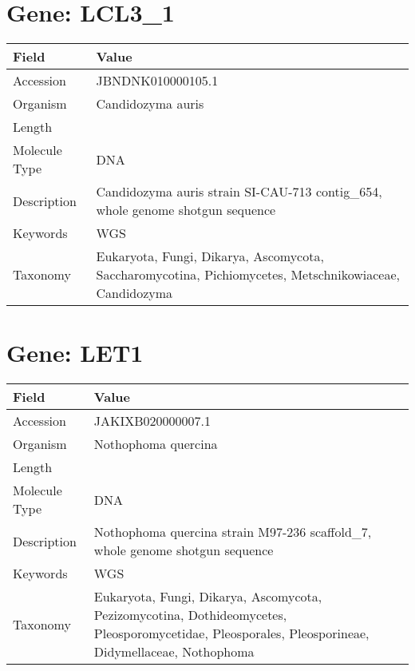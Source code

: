 \documentclass[10pt]{article}
\begin{document}
\section*{Gene: LCL3\_1}
{\footnotesize
\begin{longtable}{>{\raggedright\arraybackslash}p{4.5cm} >{\raggedright\arraybackslash}p{11.5cm}}
\textbf{Field} & \textbf{Value} \\
\hline
Accession & JBNDNK010000105.1 \\
Organism & Candidozyma auris \\
Length & 128416 \\
Molecule Type & DNA \\
Description & Candidozyma auris strain SI-CAU-713 contig\_654, whole genome shotgun sequence \\
Keywords & WGS \\
Taxonomy & Eukaryota, Fungi, Dikarya, Ascomycota, Saccharomycotina, Pichiomycetes, Metschnikowiaceae, Candidozyma \\
\end{longtable}
}


\section*{Gene: LET1}
{\footnotesize
\begin{longtable}{>{\raggedright\arraybackslash}p{4.5cm} >{\raggedright\arraybackslash}p{11.5cm}}
\textbf{Field} & \textbf{Value} \\
\hline
Accession & JAKIXB020000007.1 \\
Organism & Nothophoma quercina \\
Length & 1165732 \\
Molecule Type & DNA \\
Description & Nothophoma quercina strain M97-236 scaffold\_7, whole genome shotgun sequence \\
Keywords & WGS \\
Taxonomy & Eukaryota, Fungi, Dikarya, Ascomycota, Pezizomycotina, Dothideomycetes, Pleosporomycetidae, Pleosporales, Pleosporineae, Didymellaceae, Nothophoma \\
\end{longtable}
}
\end{document}
